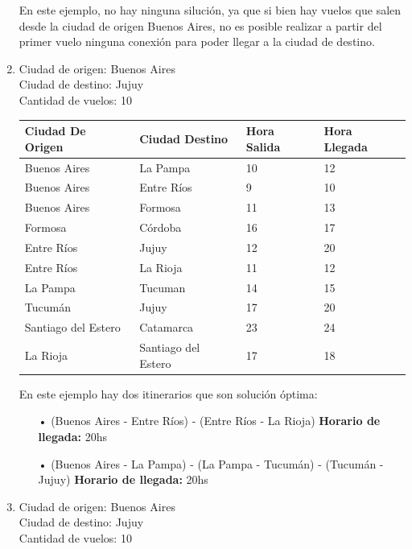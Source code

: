 \documentclass[10pt,a4paper]{article}
\begin{document}
\begin{enumerate}
En este ejemplo, no hay ninguna silución, ya que si bien hay vuelos que salen desde la ciudad de origen Buenos Aires, no es posible realizar a partir del primer vuelo ninguna conexión para poder llegar a la ciudad de destino.\\


\item
Ciudad de origen: Buenos Aires\\
Ciudad de destino: Jujuy\\
Cantidad de vuelos: 10\\

\begin{center}
	\begin{tabular}{| l | l | l | l |}
	\hline
	Ciudad De Origen & Ciudad Destino & Hora Salida & Hora Llegada\\ \hline
	Buenos Aires & La Pampa & 10 &	12\\
	Buenos Aires & Entre Ríos & 9 & 10 \\
	Buenos Aires & Formosa	&	11	& 13\\
	Formosa	& Córdoba	& 16 & 17  \\
	Entre Ríos & Jujuy	& 12 & 20\\
	Entre Ríos & La Rioja	&	11 & 12\\
	La Pampa & Tucuman	&	14 & 15\\
	Tucumán & Jujuy &	17 & 20\\
	Santiago del Estero	& Catamarca & 23 & 24\\
	La Rioja & Santiago del Estero & 17&18\\
	\hline
	\end{tabular}
\end{center}
\newpage

En este ejemplo hay dos itinerarios que son solución óptima:

\begin{itemize}
\item[•] (Buenos Aires - Entre Ríos) - (Entre Ríos - La Rioja) \textbf{Horario de llegada: } 20hs

\item[•] (Buenos Aires - La Pampa) - (La Pampa - Tucumán) - (Tucumán - Jujuy) \textbf{Horario de llegada: } 20hs\\
\end{itemize}


\item
Ciudad de origen: Buenos Aires\\
Ciudad de destino: Jujuy\\
Cantidad de vuelos: 10\\


\end{enumerate}
\end{document}
